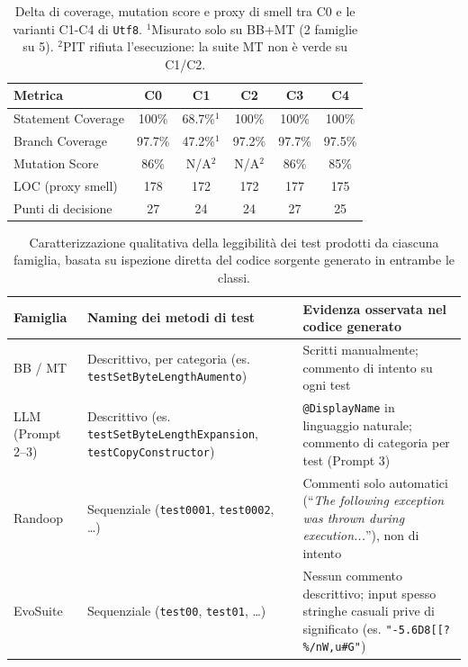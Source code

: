 \begin{table}[h]
\centering
\footnotesize
\begin{tabular}{lccccc}
\toprule
\textbf{Metrica} & \textbf{C0} & \textbf{C1} & \textbf{C2} & \textbf{C3} & \textbf{C4} \\
\midrule
Statement Coverage & 100\% & 68.7\%$^1$ & 100\% & 100\% & 100\% \\
Branch Coverage & 97.7\% & 47.2\%$^1$ & 97.2\% & 97.7\% & 97.5\% \\
Mutation Score & 86\% & N/A$^2$ & N/A$^2$ & 86\% & 85\% \\
LOC (proxy smell) & 178 & 172 & 172 & 177 & 175 \\
Punti di decisione & 27 & 24 & 24 & 27 & 25 \\
\bottomrule
\end{tabular}
\caption{Delta di coverage, mutation score e proxy di smell tra C0 e le varianti C1-C4 di \texttt{Utf8}. $^1$Misurato solo su BB+MT (2 famiglie su 5). $^2$PIT rifiuta l'esecuzione: la suite MT non è verde su C1/C2.}
\label{tab:utf8-refactor-delta}
\end{table}

\begin{table}[h]
\centering
\footnotesize
\begin{tabular}{p{2.2cm}p{4.4cm}p{6.4cm}}
\toprule
\textbf{Famiglia} & \textbf{Naming dei metodi di test} & \textbf{Evidenza osservata nel codice generato} \\
\midrule
BB / MT & Descrittivo, per categoria (es. \texttt{testSetByteLengthAumento}) & Scritti manualmente; commento di intento su ogni test \\
LLM (Prompt 2--3) & Descrittivo (es. \texttt{testSetByteLengthExpansion}, \texttt{testCopyConstructor}) & \texttt{@DisplayName} in linguaggio naturale; commento di categoria per test (Prompt 3) \\
Randoop & Sequenziale (\texttt{test0001}, \texttt{test0002}, \dots) & Commenti solo automatici (``\emph{The following exception was thrown during execution...}''), non di intento \\
EvoSuite & Sequenziale (\texttt{test00}, \texttt{test01}, \dots) & Nessun commento descrittivo; input spesso stringhe casuali prive di significato (es. \texttt{"-5.6D8[[?\%/nW,u\#G"}) \\
\bottomrule
\end{tabular}
\caption{Caratterizzazione qualitativa della leggibilità dei test prodotti da ciascuna famiglia, basata su ispezione diretta del codice sorgente generato in entrambe le classi.}
\label{tab:test-clarity}
\end{table}

